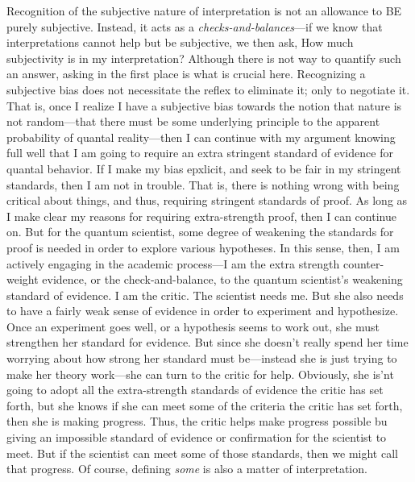 \documentclass{article}
\begin{document}
Recognition of the subjective nature of interpretation is not an allowance to BE purely subjective. Instead, it acts as a \textsl{checks-and-balances}---if we know that interpretations cannot help but be subjective, we then ask, How much subjectivity is in my interpretation? Although there is not way to quantify such an answer, asking in the first place is what is crucial here. Recognizing a subjective bias does not necessitate the reflex to eliminate it; only to negotiate it. That is, once I realize I have a subjective bias towards the notion that nature is not random---that there must be some underlying principle to the apparent probability of quantal reality---then I can continue with my argument knowing full well that I am going to require an extra stringent standard of evidence for quantal behavior. If I make my bias epxlicit, and seek to be fair in my stringent standards, then I am not in trouble. That is, there is nothing wrong with being critical about things, and thus, requiring stringent standards of proof. As long as I make clear my reasons for requiring extra-strength proof, then I can continue on. But for the quantum scientist, some degree of weakening the standards for proof is needed in order to explore various hypotheses. In this sense, then, I am actively engaging in the academic process---I am the extra strength counter-weight evidence, or the check-and-balance, to the quantum scientist's weakening standard of evidence. I am the critic. The scientist needs me. But she also needs to have a fairly weak sense of evidence in order to experiment and hypothesize. Once an experiment goes well, or a hypothesis seems to work out, she must strengthen her standard for evidence. But since she doesn't really spend her time worrying about how strong her standard must be---instead she is just trying to make her theory work---she can turn to the critic for help. Obviously, she is'nt going to adopt all the extra-strength standards of evidence the critic has set forth, but she knows if she can meet some of the criteria the critic has set forth, then she is making progress. Thus, the critic helps make progress possible bu giving an impossible standard of evidence or confirmation for the scientist to meet. But if the scientist can meet some of those standards, then we might call that progress. Of course, defining \textsl{some} is also a matter of interpretation. 
\end{document}
